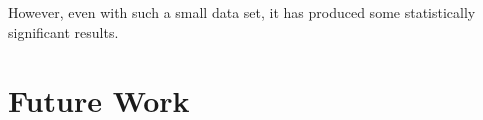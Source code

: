 However, even with such a small data set, it has produced some statistically significant results. 















            















\section{Future Work}


















